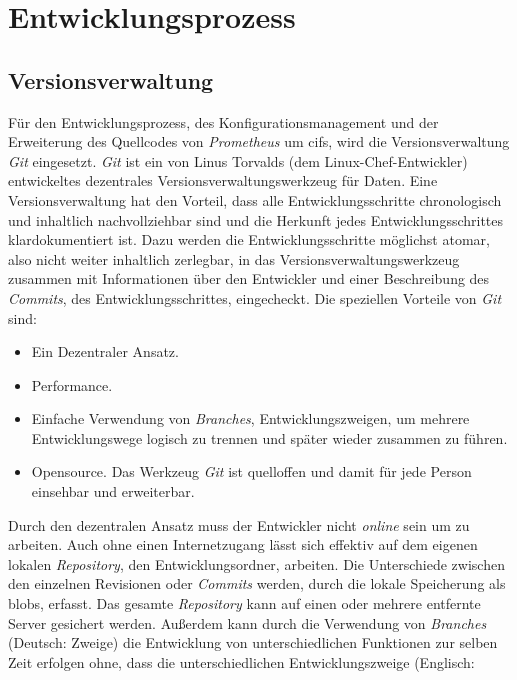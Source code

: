 \documentclass[titlepage]{report}
\begin{document}
\section*{Entwicklungsprozess}
\subsection*{Versionsverwaltung}
Für den Entwicklungsprozess, des Konfigurationsmanagement und der
Erweiterung des Quellcodes von \emph{Prometheus} um \gls{cifs}, wird die
Versionsverwaltung \emph{Git} eingesetzt. \emph{Git} ist ein von Linus
Torvalds (dem Linux\hyp{}Chef\hyp{}Entwickler) entwickeltes dezentrales
Versionsverwaltungswerkzeug für Daten\cite{GITWIKI}. Eine
Versionsverwaltung hat den Vorteil, dass alle Entwicklungsschritte
chronologisch und inhaltlich nachvollziehbar sind und die Herkunft jedes
Entwicklungsschrittes klardokumentiert ist. Dazu werden die
Entwicklungsschritte möglichst atomar, also nicht weiter inhaltlich
zerlegbar, in das Versionsverwaltungswerkzeug zusammen mit Informationen
über den Entwickler und einer Beschreibung des \emph{Commits}, des
Entwicklungsschrittes, eingecheckt\cite{GITBOOK}. Die speziellen
Vorteile von \emph{Git} sind:
\begin{itemize}
    \item Ein Dezentraler Ansatz.
    \item Performance.
    \item Einfache Verwendung von \emph{Branches}, Entwicklungszweigen,
        um mehrere Entwicklungswege logisch zu trennen und später wieder
        zusammen zu führen.
    \item Opensource. Das Werkzeug \emph{Git} ist quelloffen und damit
        für jede Person einsehbar und erweiterbar.
\end{itemize}
Durch den dezentralen Ansatz muss der Entwickler nicht
\emph{online} sein um zu arbeiten. Auch ohne einen Internetzugang lässt
sich effektiv auf dem eigenen lokalen \emph{Repository}, den
Entwicklungsordner, arbeiten. Die Unterschiede zwischen den einzelnen
Revisionen oder \emph{Commits} werden, durch die lokale Speicherung als
\glspl{blob}, erfasst. Das gesamte \emph{Repository} kann auf einen oder
mehrere entfernte Server gesichert werden\cite{GITOTTO}. Außerdem kann
durch die Verwendung von \emph{Branches} (Deutsch: Zweige) die
Entwicklung von unterschiedlichen Funktionen zur selben Zeit erfolgen
ohne, dass die unterschiedlichen Entwicklungszweige (Englisch:
\end{document}
